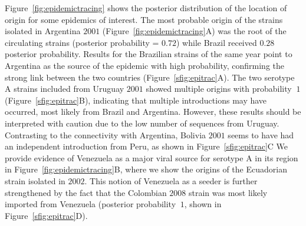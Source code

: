 \documentclass[10pt]{article}
\begin{document}
Figure~\ref{fig:epidemictracing} shows the posterior distribution of the  location of origin for some epidemics of interest.
The most probable origin of the strains isolated in Argentina $2001$ (Figure~\ref{fig:epidemictracing}A) was the root of the circulating strains (posterior probability = $0.72$) while Brazil received $0.28$ posterior probability.
Results for the Brazilian strains of the same year point to Argentina as the source of the epidemic with high probability, confirming the strong link between the two countries (Figure~\ref{sfig:epitrac}A).
The two serotype A strains included from Uruguay $2001$ showed multiple origins with probability $~1$ (Figure~\ref{sfig:epitrac}B), indicating that multiple introductions may have occurred, most likely from Brazil and Argentina.
However, these results should be interpreted with caution due to the low number of sequences from Uruguay.
Contrasting to the connectivity with Argentina, Bolivia $2001$ seems to have had an independent introduction from Peru, as shown in Figure~\ref{sfig:epitrac}C
We provide evidence of Venezuela as a major viral source for serotype A in its region in Figure~\ref{fig:epidemictracing}B, where we show the origins of the Ecuadorian strain isolated in $2002$.
This notion of Venezuela as a seeder is further strengthened by the fact that the Colombian $2008$ strain was most likely imported from Venezuela (posterior probability $~1$, shown in Figure~\ref{sfig:epitrac}D).
\end{document}
